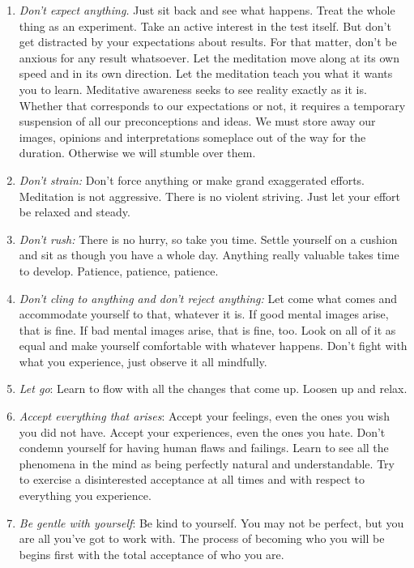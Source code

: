 \begin{enumerate}
\item \emph{Don't expect anything.} Just sit back and see what happens. Treat the whole
thing as an experiment. Take an active interest in the test itself. But don't
get distracted by your expectations about results. For that matter, don't be
anxious for any result whatsoever. Let the meditation move along at its own
speed and in its own direction. Let the meditation teach you what it wants you
to learn. Meditative awareness seeks to see reality exactly as it is. Whether
that corresponds to our expectations or not, it requires a temporary suspension
of all our preconceptions and ideas. We must store away our images, opinions and
interpretations someplace out of the way for the duration. Otherwise we will
stumble over them.

\item \emph{Don't strain:} Don't force anything or make grand exaggerated efforts.
Meditation is not aggressive. There is no violent striving. Just let your effort
be relaxed and steady.

\item \emph{Don't rush:} There is no hurry, so take you time. Settle yourself on a cushion
and sit as though you have a whole day.
Anything really valuable takes time to develop. Patience, patience, patience.

\item \emph{Don't cling to anything and don't reject anything:} Let come what comes and
accommodate yourself to that, whatever it is. If good mental images arise, that
is fine. If bad mental images arise, that is fine, too. Look on all of it as
equal and make yourself comfortable with whatever happens. Don't fight with what
you experience, just observe it all mindfully.

\item \emph{Let go}: Learn to flow with all the changes that come up. Loosen up and relax.

\item \emph{Accept everything that arises}: Accept your feelings, even the ones
you wish you did not have. Accept your experiences, even the ones you hate.
Don't condemn yourself for having human flaws and failings. Learn to see all the
phenomena in the mind as being perfectly natural and understandable. Try to
exercise a disinterested acceptance at all times and with respect to everything
you experience.

\item \emph{Be gentle with yourself}: Be kind to yourself. You may not be
perfect, but you are all you've got to work with. The process of becoming who
you will be begins first with the total acceptance of who you are.


\end{enumerate}
